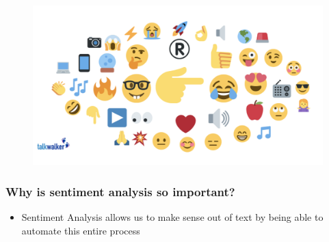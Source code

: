 \documentclass[compress, aspectratio=54]{beamer}
\begin{document}
\begin{frame}
\begin{figure}

\includegraphics[width=0.85\linewidth ]{Figures/emoji.png}
\end{figure}

\end{frame}


\begin{frame}

\frametitle{Why is sentiment analysis so important?}
\begin{itemize}
\item Sentiment Analysis allows us to make sense out of text by being able to automate this entire process
\end{itemize}
\end{frame}
\end{document}
